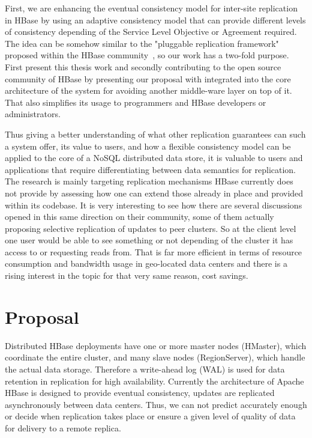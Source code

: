 First, we are enhancing the eventual consistency model for inter-site replication in HBase by using an adaptive consistency model that can provide different levels of consistency depending of the Service Level Objective or Agreement required. The idea can be somehow similar to the "pluggable replication framework" proposed within the HBase community~\cite{JIRA-1}, so our work has a two-fold purpose. First present this thesis work and secondly contributing to the open source community of HBase by presenting our proposal with integrated into the core architecture of the system for avoiding another middle-ware layer on top of it. That also simplifies its usage to programmers and HBase developers or administrators.

Thus giving a better understanding of what other replication guarantees can such a system offer, its value to users, and how a flexible consistency model can be applied to the core of a NoSQL distributed data store, it is valuable to users and applications that require differentiating between data semantics for replication. The research is mainly targeting replication mechanisms HBase currently does not provide by assessing how one can extend those already in place and provided within its codebase. It is very interesting to see how there are several discussions opened in this same direction on their community, some of them actually proposing selective replication of updates to peer clusters. So at the client level one user would be able to see something or not depending of the cluster it has access to or requesting reads from. That is far more efficient in terms of resource consumption and bandwidth usage in geo-located data centers and there is a rising interest in the topic for that very same reason, cost savings.



\section{Proposal}
Distributed HBase deployments have one or more master nodes (HMaster), which coordinate the entire cluster, and many slave nodes (RegionServer), which handle the actual data storage.  Therefore a write-ahead log (WAL) is used for data retention in replication for high availability. Currently the architecture of Apache HBase is designed to provide eventual consistency, updates are replicated asynchronously between data centers. Thus, we can not predict accurately enough or decide when replication takes place or ensure a given level of quality of data for delivery to a remote replica.

